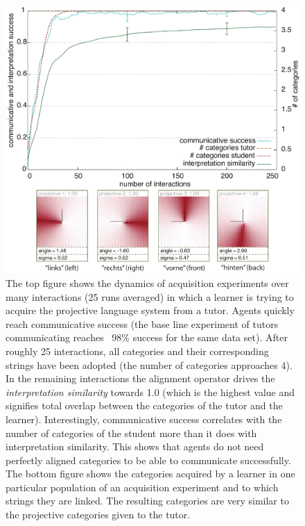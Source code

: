 \begin{figure} 
\begin{center}
\includegraphics[width=0.8\columnwidth]{figs/category-acquisition-projective-results+categories}
\end{center}
\caption[Results acquisition of the projective system]{%
The top figure shows the dynamics of 
acquisition experiments over many interactions (25 runs averaged) in which 
a learner is trying to acquire the projective language system from a tutor.
Agents quickly reach communicative success (the base line experiment of tutors communicating 
reaches ~98\% success for the same data set). After roughly 25 interactions, all categories and their 
corresponding strings have been adopted (the number of categories approaches 4). 
In the remaining interactions the alignment operator drives the \emph{interpretation
similarity} towards 1.0 (which is the highest value and signifies total overlap between the categories
of the tutor and the learner). Interestingly, communicative success correlates
with the number of categories of the student more than it does with interpretation similarity.
This shows that agents do not need perfectly aligned categories to be able to communicate successfully.
The bottom figure shows the categories acquired by a learner in one 
particular population of an acquisition experiment and to which strings they are linked. 
The resulting categories are very similar to the projective categories given to the tutor.}
\label{f:category-acquisition-projective-results}
\end{figure}

